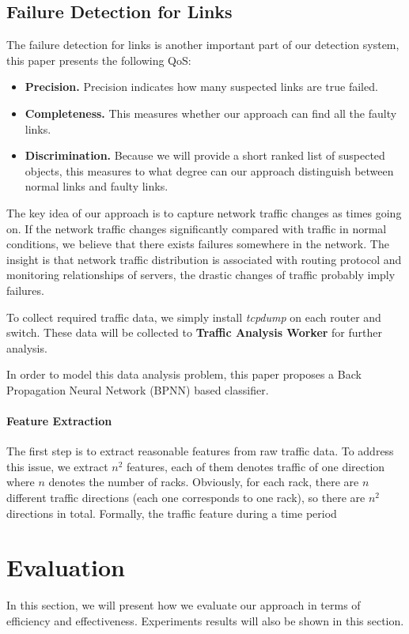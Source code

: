 \documentclass{sig-alternate-05-2015}
\begin{document}
\subsection{Failure Detection for Links}
The failure detection for links is another important part of our detection system, this paper presents the following QoS:
\begin{itemize}
  \item \textbf{Precision.} Precision indicates how many suspected links are true failed.
  \item \textbf{Completeness.} This measures whether our approach can find all the faulty links.
  \item \textbf{Discrimination.} Because we will provide a short ranked list of suspected objects, this measures to what degree can our approach distinguish between normal links and faulty links.
\end{itemize}

The key idea of our approach is to capture network traffic changes as times going on. If the network traffic changes significantly compared with traffic in normal conditions, we believe that there exists failures somewhere in the network. The insight is that network traffic distribution is associated with routing protocol and monitoring relationships of servers, the drastic changes of traffic probably imply failures.

To collect required traffic data, we simply install \textit{tcpdump} on each router and switch. These data will be collected to \textbf{Traffic Analysis Worker} for further analysis.

In order to model this data analysis problem, this paper proposes a Back Propagation Neural Network (BPNN) based classifier.

\paragraph{Feature Extraction}
The first step is to extract reasonable features from raw traffic data. To address this issue, we extract $n^2$ features, each of them denotes traffic of one direction where $n$ denotes the number of racks. Obviously, for each rack, there are $n$ different traffic directions (each one corresponds to one rack), so there are $n^2$ directions in total. Formally, the traffic feature during a time period 

\section{Evaluation}
In this section, we will present how we evaluate our approach in terms of efficiency and effectiveness. Experiments results will also be shown in this section.
\end{document}
